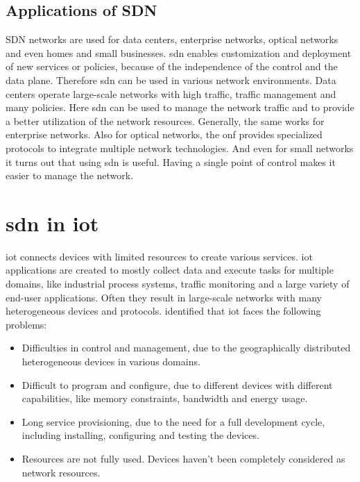 \documentclass[conference]{IEEEtran}
\begin{document}
	\subsection{Applications of SDN}

	SDN networks are used for data centers, enterprise networks, optical networks and even homes and small businesses. \ac{sdn} enables customization and deployment of new services or policies, because of the independence of the control and the data plane. Therefore \ac{sdn} can be used in various network environments. Data centers operate large-scale networks with high traffic, traffic management and many policies. Here \ac{sdn} can be used to manage the network traffic and to provide a better utilization of the network resources. Generally, the same works for enterprise networks. Also for optical networks, the \ac{onf} provides specialized protocols to integrate multiple network technologies. And even for small networks it turns out that using \ac{sdn} is useful. Having a single point of control makes it easier to manage the network. \cite{Jefia2018-pj} 



	\section{\ac{sdn} in \ac{iot}}
	\label{section:sdn-iot}

	\acf{iot} connects devices with limited resources to create various services. \ac{iot} applications are created to mostly collect data and execute tasks for multiple domains, like industrial process systems, traffic monitoring and a large variety  of end-user applications. Often they result in large-scale networks with many heterogeneous devices and protocols. \cite{Li2020-lx} \citeauthor{10.1007/s10586-023-04023-9} identified that \ac{iot} faces the following problems: 

	\begin{itemize}
		\item Difficulties in control and management, due to the geographically distributed heterogeneous devices in various domains.
		\item Difficult to program and configure, due to different devices with different capabilities, like memory constraints, bandwidth and energy usage.
		\item Long service provisioning, due to the need for a full development cycle, including installing, configuring and testing the devices. 
		\item Resources are not fully used. Devices haven't been completely considered as network resources. \cite{10.1145/3102304.3102319}
	\end{itemize}
\end{document}
